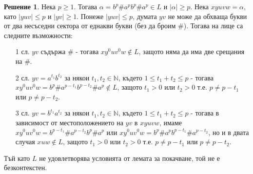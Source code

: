 \documentclass{article}
\theoremstyle{definition}
\newtheorem*{solution}{Решение}
\begin{document}
\begin{solution}
    Нека $p \geq 1$.
    Тогава $\alpha = b^p \# a^p b^p \# a^p \in L$ и $|\alpha| \geq p$.
    Нека $xyuvw = \alpha$, като $|yuv| \leq p$ и $|yv| \geq 1$.
    Понеже $|yuv| \leq p$, думата $yv$ не може да обхваща букви от два несъседни сектора от еднакви букви (без да броим $\#$).
    Тогава на лице са следните възможности:
    \begin{itemize}
        \item[1 сл.] $yv$ съдържа $\#$ - тогава $xy^0uv^0w \notin L$, защото няма да има две срещания на $\#$.
        \item[2 сл.] $yv = a^{t_1}b^{t_2}$ за някои $t_1, t_2 \in \mathbb{N}$, където $1 \leq t_1 + t_2 \leq p$ - тогава $xy^0uv^0w = b^p \# a^{p - t_1} b^{p - t_2} \# a^p \notin L$, защото $t_1 > 0$ или $t_2 > 0$ т.е. $p \neq p - t_1$ или $p \neq p - t_2$.
        \item[3 сл.] $yv = b^{t_1}a^{t_2}$ за някои $t_1, t_2 \in \mathbb{N}$, където $1 \leq t_1 + t_2 \leq p$ - тогава в зависимост от местоположението на $yv$ в $xyuvw$, имаме $xy^0uv^0w = b^{p - t_1} \# a^{p - t_2} b^p \# a^p$ или $xy^0uv^0w = b^p \# a^p b^{p - t_1} \# a^{p - t_2}$, но и в двата случая $xuw \notin L$, защото $t_1 > 0$ или $t_2 > 0$ т.е. $p \neq p - t_1$ или $p \neq p - t_2$.
    \end{itemize}
    Тъй като $L$ не удовлетворява условията от лемата за покачване, той не е безконтекстен.
\end{solution}
\end{document}

